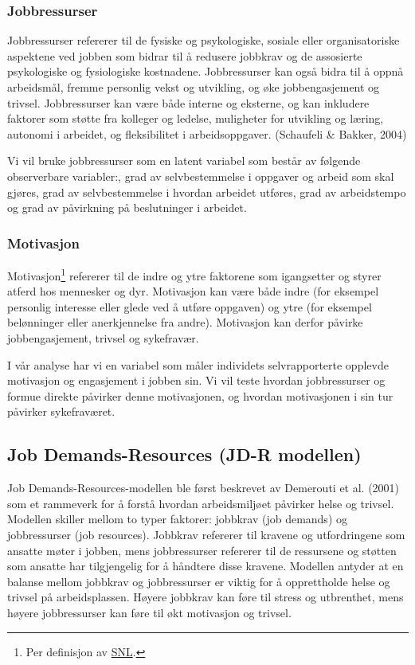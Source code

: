 \documentclass[
  12pt,
  a4paper,
  DIV=11,
  numbers=noendperiod]{scrartcl}
\begin{document}
\subsubsection{Jobbressurser}\label{jobbressurser}

Jobbressurser refererer til de fysiske og psykologiske, sosiale eller
organisatoriske aspektene ved jobben som bidrar til å redusere jobbkrav
og de assosierte psykologiske og fysiologiske kostnadene. Jobbressurser
kan også bidra til å oppnå arbeidsmål, fremme personlig vekst og
utvikling, og øke jobbengasjement og trivsel. Jobbressurser kan være
både interne og eksterne, og kan inkludere faktorer som støtte fra
kolleger og ledelse, muligheter for utvikling og læring, autonomi i
arbeidet, og fleksibilitet i arbeidsoppgaver. (Schaufeli \& Bakker,
2004)

Vi vil bruke jobbressurser som en latent variabel som består av følgende
observerbare variabler:, grad av selvbestemmelse i oppgaver og arbeid
som skal gjøres, grad av selvbestemmelse i hvordan arbeidet utføres,
grad av arbeidstempo og grad av påvirkning på beslutninger i arbeidet.

\subsubsection{Motivasjon}\label{motivasjon}

Motivasjon\footnote{Per definisjon av
  \href{https://snl.no/motivasjon\#:~:text=Motivasjon\%20er\%20en\%20samlebetegnelse\%20for,motiveres\%20til\%20\%C3\%A5\%20oppn\%C3\%A5\%20dette}{SNL}.}
refererer til de indre og ytre faktorene som igangsetter og styrer
atferd hos mennesker og dyr. Motivasjon kan være både indre (for
eksempel personlig interesse eller glede ved å utføre oppgaven) og ytre
(for eksempel belønninger eller anerkjennelse fra andre). Motivasjon kan
derfor påvirke jobbengasjement, trivsel og sykefravær.

I vår analyse har vi en variabel som måler individets selvrapporterte
opplevde motivasjon og engasjement i jobben sin. Vi vil teste hvordan
jobbressurser og formue direkte påvirker denne motivasjonen, og hvordan
motivasjonen i sin tur påvirker sykefraværet.

\subsection{Job Demands-Resources (JD-R
modellen)}\label{job-demands-resources-jd-r-modellen}

Job Demands-Resources-modellen ble først beskrevet av Demerouti et al.
(2001) som et rammeverk for å forstå hvordan arbeidsmiljøet påvirker
helse og trivsel. Modellen skiller mellom to typer faktorer: jobbkrav
(job demands) og jobbressurser (job resources). Jobbkrav refererer til
kravene og utfordringene som ansatte møter i jobben, mens jobbressurser
refererer til de ressursene og støtten som ansatte har tilgjengelig for
å håndtere disse kravene. Modellen antyder at en balanse mellom jobbkrav
og jobbressurser er viktig for å opprettholde helse og trivsel på
arbeidsplassen. Høyere jobbkrav kan føre til stress og utbrenthet, mens
høyere jobbressurser kan føre til økt motivasjon og trivsel.
\end{document}
